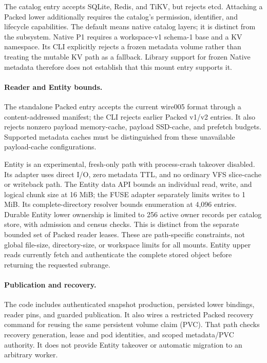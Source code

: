 The  catalog entry accepts SQLite, Redis, and TiKV, but
rejects etcd. Attaching a Packed lower additionally requires the catalog's
permission, identifier, and lifecycle capabilities. The default
 means native catalog layers; it is distinct
from the  subsystem. Native P1 requires a workspace-v1
schema-1 base and a KV namespace. Its CLI explicitly rejects a frozen
metadata volume rather than treating the mutable KV path as a fallback.
Library support for frozen Native metadata therefore does not establish
that this mount entry supports it.

\paragraph{Reader and Entity bounds.}
The standalone Packed entry accepts the current wire005 format through a
content-addressed manifest; the CLI rejects earlier Packed v1/v2 entries.
It also rejects nonzero payload memory-cache, payload SSD-cache, and
prefetch budgets. Supported metadata caches must be distinguished from
these unavailable payload-cache configurations.

Entity is an experimental, fresh-only path with process-crash takeover
disabled. Its adapter uses direct I/O, zero metadata TTL, and no ordinary
VFS slice-cache or writeback path. The Entity data API bounds an individual
read, write, and logical chunk size at 16 MiB; the FUSE adapter separately
limits writes to 1 MiB. Its complete-directory resolver bounds enumeration
at 4,096 entries. Durable Entity lower ownership is limited to 256 active
owner records per catalog store, with admission and census checks. This is
distinct from the separate bounded set of Packed reader leases. These are
path-specific constraints, not global file-size, directory-size, or workspace
limits for all mounts. Entity upper reads currently fetch and authenticate
the complete stored object before returning the requested subrange.

\paragraph{Publication and recovery.}
The code includes authenticated snapshot production, persisted lower
bindings, reader pins, and guarded publication. It also wires a restricted
Packed recovery command for reusing the same persistent volume claim
(PVC). That path checks recovery generation, lease and pod identities, and
scoped metadata/PVC authority. It does not provide Entity takeover or
automatic migration to an arbitrary worker.

